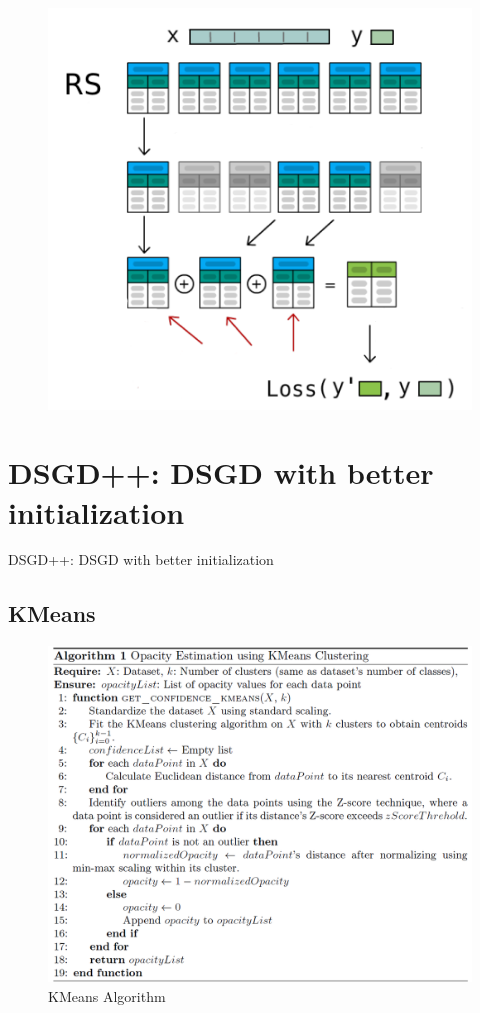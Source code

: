 \documentclass[aspectratio=169]{beamer}
\begin{document}
\begin{frame}
\begin{figure}
    \centering
    \includegraphics[width=0.55\linewidth]{../../fig/dst_ill_eng.png}
\end{figure}
\end{frame}

\section{DSGD++: DSGD with better initialization}
\begin{frame}
    \begin{center}
        \Huge DSGD++: DSGD with better initialization
    \end{center}
\end{frame}

\subsection{KMeans}
\begin{frame}
\begin{figure}
    \centering
    \includegraphics[width=0.68\linewidth]{../../fig/alg_kmeans_opacity.png}
    \caption{KMeans Algorithm}
    \label{fig:alg_kmeans}
\end{figure}
\end{frame}
\end{document}
